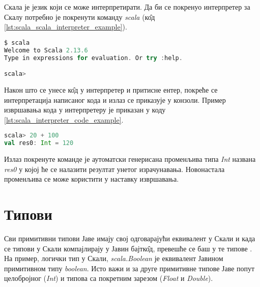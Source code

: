 \documentclass[12pt,oneside]{memoir}
\begin{document}
Скала је језик који се може интерпретирати. Да би се покренуо интерпретер за Скалу потребно је покренути команду \textit{scala} (к\^{о}д \ref{lst:scala_scala_interpreter_example}).

\begin{lstlisting}[language=Scala, caption={Интерпретер за Скалу}, label={lst:scala_scala_interpreter_example}, basicstyle=\small]
$ scala
Welcome to Scala 2.13.6
Type in expressions for evaluation. Or try :help.

scala>
\end{lstlisting}

Након што се унесе к\^{о}д у интерпретер и притисне ентер, покреће се интерпретација написаног кода и излаз се приказује у конзоли. Пример извршавања кода у интерпретеру је приказан у коду \ref{lst:scala_interpreter_code_example}.

\begin{lstlisting}[language=Scala, caption={Пример извршавања кода у интерпретеру}, label={lst:scala_interpreter_code_example}, basicstyle=\small]
scala> 20 + 100
val res0: Int = 120
\end{lstlisting}

Излаз покренуте команде је аутоматски генерисана променљива типа \textit{Int} названа \textit{res0} у којој ће се налазити резултат унетог израчунавања. Новонастала променљива се може користити у наставку извршавања.



%

\section{Типови}
\label{sec:scala_tip}

Сви примитивни типови Јаве имају свој одговарајући еквивалент у Скали и када се типови у Скали компајлирају у Јавин бајтк\^{о}д, превешће се баш у те типове \cite{scala_prog}. На пример, логички тип у Скали, \textit{scala.Boolean} је еквивалент Јавином примитивном типу \textit{boolean}. Исто важи и за друге примитивне типове Јаве попут целобројног (\textit{Int}) и типова са покретним зарезом (\textit{Float} и \textit{Double}).
\end{document}
